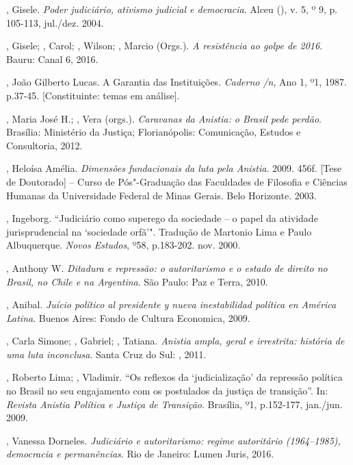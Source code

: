 , Gisele. \emph{Poder judiciário, ativismo judicial e
democracia}. Alceu (), v. 5, º 9, p. 105-113, jul./dez. 2004.

, Gisele; , Carol;  , Wilson; , Marcio
(Orgs.). \emph{A resistência ao golpe de 2016}. Bauru: Canal 6, 2016.

, João Gilberto Lucas. A Garantia das Instituições.
\emph{Caderno /n}, Ano 1, º1,
1987. p.37-45. {[}Constituinte: temas em análise{]}.

, Maria José H.; , Vera (orgs.). \emph{Caravanas da
Anistia: o Brasil pede perdão}. Brasília: Ministério da Justiça;
Florianópolis: Comunicação, Estudos e Consultoria, 2012.

, Heloísa Amélia. \emph{Dimensões fundacionais da luta pela
Anistia}. 2009. 456f. {[}Tese de Doutorado{]} -- Curso de Pós"-Graduação
das Faculdades de Filosofia e Ciências Humanas da Universidade Federal
de Minas Gerais. Belo Horizonte. 2003.

, Ingeborg. ``Judiciário como superego da sociedade -- o papel da
atividade jurisprudencial na `sociedade orfã'". Tradução de Martonio Lima
e Paulo Albuquerque. \emph{Novos Estudos}, º58, p.183-202. nov. 2000.

, Anthony W. \emph{Ditadura e repressão: o autoritarismo e o
estado de direito no Brasil, no Chile e na Argentina}. São Paulo: Paz e
Terra, 2010.

, Anibal. \emph{Juício político al presidente y nueva
inestabilidad política en América Latina}. Buenos Aires: Fondo de
Cultura Economica, 2009.

, Carla Simone; , Gabriel; , Tatiana.
\emph{Anistia ampla, geral e irrestrita: história de uma luta
inconclusa}. Santa Cruz do Sul: , 2011.

, Roberto Lima;  , Vladimir. ``Os reflexos da
`judicialização' da repressão política no Brasil no seu engajamento com
os postulados da justiça de transição''. In: \emph{Revista Anistia
Política e Justiça de Transição}. Brasília, º1, p.152-177, jan./jun.
2009.

, Vanessa Dorneles. \emph{Judiciário e autoritarismo: regime
autoritário (1964--1985), democracia e permanências}. Rio de Janeiro:
Lumen Juris, 2016.

